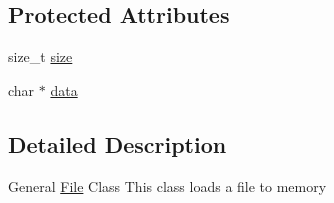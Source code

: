 \subsection*{Protected Attributes}
\begin{DoxyCompactItemize}
\item 
size\+\_\+t \hyperlink{classZeta_1_1File_a4693dd90932cd5d4c7303a101050a5ce}{size}
\item 
char $\ast$ \hyperlink{classZeta_1_1File_ada4a3a7dbe4e52d9176e84b99d33c19c}{data}
\end{DoxyCompactItemize}


\subsection{Detailed Description}
General \hyperlink{classZeta_1_1File}{File} Class This class loads a file to memory 

